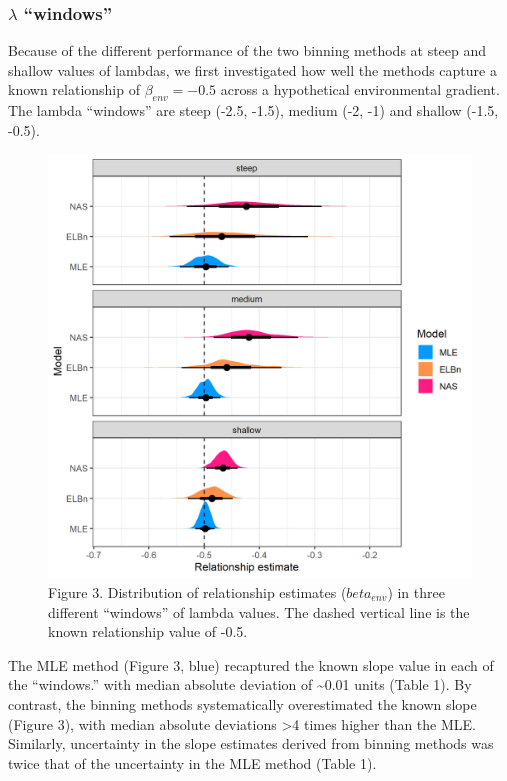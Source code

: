 \documentclass[
]{article}
\begin{document}
\hypertarget{lambda-windows}{%
\subsubsection{\texorpdfstring{\(\lambda\)
``windows''}{\textbackslash lambda ``windows''}}\label{lambda-windows}}

Because of the different performance of the two binning methods at steep
and shallow values of lambdas, we first investigated how well the
methods capture a known relationship of \(\beta_{env} = -0.5\) across a
hypothetical environmental gradient. The lambda ``windows'' are steep
(-2.5, -1.5), medium (-2, -1) and shallow (-1.5, -0.5).

\begin{figure}
\centering
\includegraphics{figures/lambda_angle_plot.png}
\caption{Figure 3. Distribution of relationship estimates
(\(beta_{env}\)) in three different ``windows'' of lambda values. The
dashed vertical line is the known relationship value of -0.5.}
\end{figure}

The MLE method (Figure 3, blue) recaptured the known slope value in each
of the ``windows.'' with median absolute deviation of
\textasciitilde0.01 units (Table 1). By contrast, the binning methods
systematically overestimated the known slope (Figure 3), with median
absolute deviations \textgreater4 times higher than the MLE. Similarly,
uncertainty in the slope estimates derived from binning methods was
twice that of the uncertainty in the MLE method (Table 1).
\end{document}
